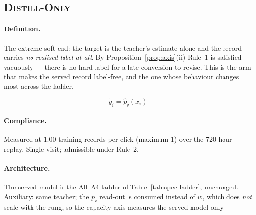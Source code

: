 \subsection{\textsc{Distill-Only}}\label{app:m-DISTILL-pvmlp}

\paragraph{Definition.} The extreme soft end: the target is the teacher's estimate alone and the record
   carries \emph{no realised label at all}. By Proposition~\ref{prop:axis}(ii) Rule~1 is satisfied
   vacuously --- there is no hard label for a late conversion to revise. This is the arm that makes
   the served record label-free, and the one whose behaviour changes most across the ladder.

\begin{equation}
\tilde y_i = \hat p_v(x_i)
\end{equation}

\begin{center}\end{center}

\paragraph{Compliance.} Measured at $1.00$ training records per click (maximum 1) over the 720-hour replay. Single-visit; admissible under Rule~2.

\paragraph{Architecture.} The served model is the A0--A4 ladder of Table~\ref{tab:spec-ladder}, unchanged. Auxiliary: same teacher; the $p_v$ read-out is consumed instead of $w$, which does \emph{not} scale with the rung, so the capacity axis measures the served model only.

